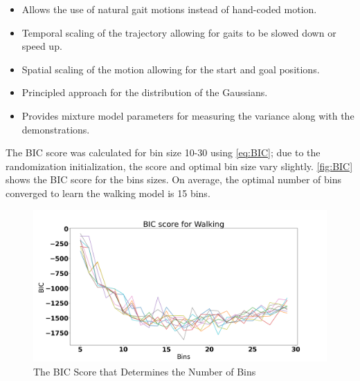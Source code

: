 \begin{itemize}
    \item Allows the use of natural gait motions instead of hand-coded motion.
    \item Temporal scaling of the trajectory allowing for gaits to be slowed down or speed up.
    \item Spatial scaling of the motion allowing for the start and goal positions.
    \item Principled approach for the distribution of the Gaussians.
    \item Provides mixture model parameters for measuring the variance along with the demonstrations.
\end{itemize}


The BIC score was calculated for bin size 10-30 using  \autoref{eq:BIC}; due to the randomization initialization, the score and optimal bin size vary slightly. \autoref{fig:BIC} shows the BIC score for the bins sizes. On average, the optimal number of bins converged to learn the walking model is 15 bins.    

\begin{figure}
    \centering
    \includegraphics[scale=0.3]{images/gait_data/BIC_Walk.png}
    \caption[BIC Score for Walking]{The BIC Score that Determines the Number of Bins}
    \label{fig:BIC}
\end{figure}

